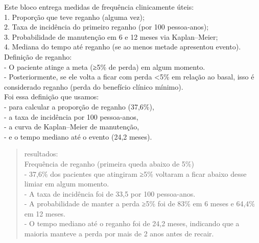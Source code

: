 \documentclass[
]{article}
\begin{document}
Este bloco entrega medidas de frequência clinicamente úteis:\\
1. Proporção que teve reganho (alguma vez);\\
2. Taxa de incidência do primeiro reganho (por 100 pessoa‑anos);\\
3. Probabilidade de manutenção em 6 e 12 meses via Kaplan--Meier;\\
4. Mediana do tempo até reganho (se ao menos metade apresentou
evento).\\

Definição de reganho:\\
- O paciente atinge a meta (≥5\% de perda) em algum momento.\\
- Posteriormente, se ele volta a ficar com perda \textless5\% em relação
ao basal, isso é considerado reganho (perda do benefício clínico
mínimo).\\

Foi essa definição que usamos:\\
- para calcular a proporção de reganho (37,6\%),\\
- a taxa de incidência por 100 pessoa-anos,\\
- a curva de Kaplan--Meier de manutenção,\\
- e o tempo mediano até o evento (24,2 meses).\\

\begin{quote}
resultados:\\
Frequência de reganho (primeira queda abaixo de 5\%)\\
- 37,6\% dos pacientes que atingiram ≥5\% voltaram a ficar abaixo desse
limiar em algum momento.\\
- A taxa de incidência foi de 33,5 por 100 pessoa-anos.\\
- A probabilidade de manter a perda ≥5\% foi de 83\% em 6 meses e 64,4\%
em 12 meses.\\
- O tempo mediano até o reganho foi de 24,2 meses, indicando que a
maioria manteve a perda por mais de 2 anos antes de recair.\\
\end{quote}
\end{document}
